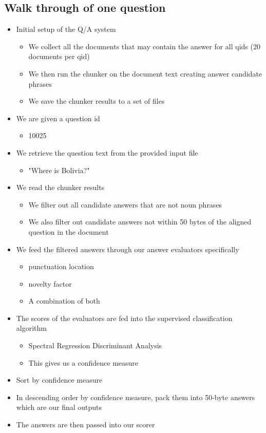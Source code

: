 \documentclass{article}
\begin{document}
\subsection{Walk through of one question}
\begin{itemize}
\item Initial setup of the Q/A system
    \begin{itemize}
    \item We collect all the documents that may contain the answer for all qids (20 documents per qid)
    \item We then run the chunker on the document text creating answer candidate phrases
    \item We save the chunker results to a set of files
    \end{itemize}
\item We are given a question id
    \begin{itemize}
    \item 10025
    \end{itemize}
\item We retrieve the question text from the provided input file
    \begin{itemize}
    \item "Where is Bolivia?"
    \end{itemize}
\item We read the chunker results 
    \begin{itemize}
    \item We filter out all candidate answers that are not noun phrases
    \item We also filter out candidate answers not within 50 bytes of the aligned question in the document
    \end{itemize}
\item We feed the filtered answers through our answer evaluators specifically
    \begin{itemize}
    \item punctuation location
    \item novelty factor
    \item A combination of both
    \end{itemize}
\item The scores of the evaluators are fed into the supervised classification algorithm
    \begin{itemize}
    \item Spectral Regression Discriminant Analysis 
    \item This gives us a confidence measure
    \end{itemize}
\item Sort by confidence measure 
\item In descending order by confidence measure, pack them into 50-byte answers which are our final outputs
\item The answers are then passed into our scorer
\end{itemize}
\end{document}
